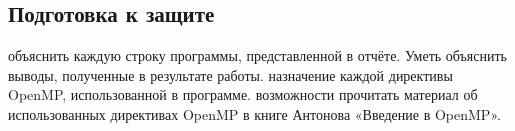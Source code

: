 { %
	\subsection{Подготовка к защите}
	\begin{enumerate}
		 объяснить каждую строку программы, представленной в отчёте. Уметь объяснить выводы, полученные в результате работы.
		 назначение каждой директивы OpenMP, использованной в программе.
		 возможности прочитать материал об использованных директивах OpenMP в книге Антонова «Введение в OpenMP».
	\end{enumerate}
}